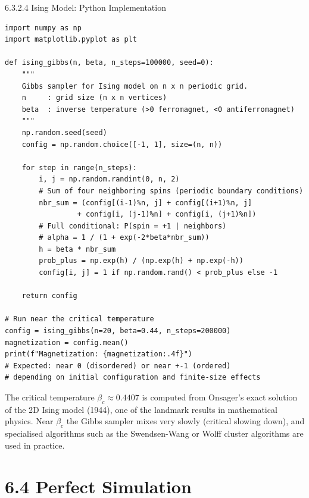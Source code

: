 \documentclass[aspectratio=169,10pt]{beamer}
\begin{document}
\begin{frame}[fragile]{6.3.2.4 Ising Model: Python Implementation}
\begin{lstlisting}[style=python]
import numpy as np
import matplotlib.pyplot as plt

def ising_gibbs(n, beta, n_steps=100000, seed=0):
    """
    Gibbs sampler for Ising model on n x n periodic grid.
    n     : grid size (n x n vertices)
    beta  : inverse temperature (>0 ferromagnet, <0 antiferromagnet)
    """
    np.random.seed(seed)
    config = np.random.choice([-1, 1], size=(n, n))

    for step in range(n_steps):
        i, j = np.random.randint(0, n, 2)
        # Sum of four neighboring spins (periodic boundary conditions)
        nbr_sum = (config[(i-1)%n, j] + config[(i+1)%n, j]
                 + config[i, (j-1)%n] + config[i, (j+1)%n])
        # Full conditional: P(spin = +1 | neighbors)
        # alpha = 1 / (1 + exp(-2*beta*nbr_sum))
        h = beta * nbr_sum
        prob_plus = np.exp(h) / (np.exp(h) + np.exp(-h))
        config[i, j] = 1 if np.random.rand() < prob_plus else -1

    return config

# Run near the critical temperature
config = ising_gibbs(n=20, beta=0.44, n_steps=200000)
magnetization = config.mean()
print(f"Magnetization: {magnetization:.4f}")
# Expected: near 0 (disordered) or near +-1 (ordered)
# depending on initial configuration and finite-size effects
\end{lstlisting}

The critical temperature $\beta_c \approx 0.4407$ is computed from Onsager's exact solution of the 2D Ising model (1944), one of the landmark results in mathematical physics.
Near $\beta_c$ the Gibbs sampler mixes very slowly (critical slowing down), and specialised algorithms such as the Swendsen-Wang or Wolff cluster algorithms are used in practice.
\end{frame}

\section{6.4 Perfect Simulation}
\end{document}
